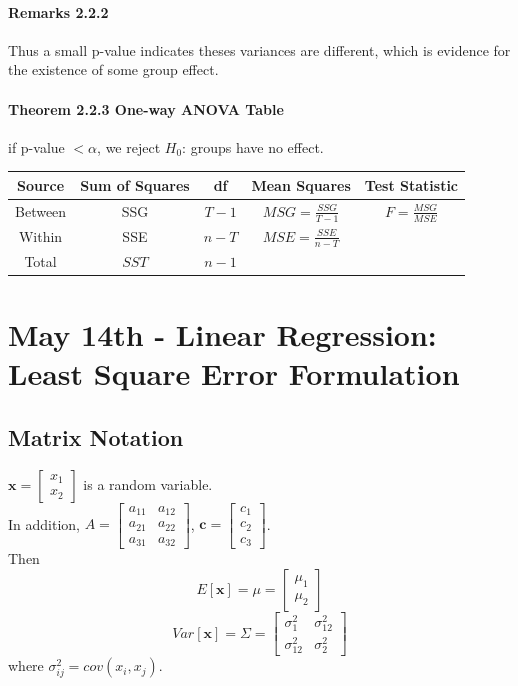 \documentclass[11pt]{article}
\newcommand{\tb}[1]{\textbf{#1}}
\newcommand{\vx}[0]{\tb{x}}
\newcommand{\vc}[0]{\tb{c}}
\begin{document}
\paragraph{Remarks 2.2.2} Thus a small p-value indicates theses variances are different, which is evidence for the existence of some group effect.
\paragraph{Theorem 2.2.3 One-way ANOVA Table} if p-value $< \alpha$, we reject $H_0$: groups have no effect. \\
	\begin{tabular}{|c|c|c|c|c|}
		\hline
		Source & Sum of Squares & df & Mean Squares & Test Statistic \\
		\hline
		Between & SSG & $T-1$ & $MSG = \frac{SSG}{T-1}$ & $F = \frac{MSG}{MSE}$ \\
		\hline
		Within & SSE & $n - T$ & $MSE = \frac{SSE}{n - T}$ &\\
		\hline
		Total & $SST$ & $ n -1$ &&\\
		\hline
	\end{tabular}
\section{May 14th - Linear Regression: Least Square Error Formulation}
\subsection{Matrix Notation}
$\vx = \begin{bmatrix}
	x_1 \\ x_2
\end{bmatrix}$ is a random variable. \\In addition, $A = \begin{bmatrix}
	a_{11} & a_{12} \\ a_{21} & a_{22} \\ a_{31} & a_{32}
\end{bmatrix}$, $\vc = \begin{bmatrix}
	c_1\\c_2\\c_3
\end{bmatrix}$.\\
Then $$E[\vx] = \mu = \begin{bmatrix}
	\mu_1 \\ \mu_2
\end{bmatrix}$$
$$Var[\vx] = \Sigma = \begin{bmatrix}
	\sigma^2_1 & \sigma^2_{12} \\ \sigma^2_{12} & \sigma^2_2
\end{bmatrix}$$
where $\sigma^2_{ij} = cov(x_i, x_j)$.
\end{document}
